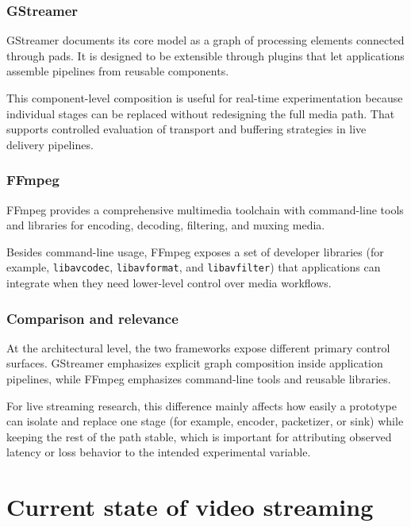 \subsubsection{GStreamer}
GStreamer documents its core model as a graph of processing elements connected through pads.
It is designed to be extensible through plugins that let applications assemble pipelines from reusable components.~\cite{gstreamerTutorials2026}

This component-level composition is useful for real-time experimentation because individual stages can be replaced without redesigning the full media path.
That supports controlled evaluation of transport and buffering strategies in live delivery pipelines.~\cite{peroniEndtoEndPipelinePerspective2025}

\subsubsection{FFmpeg}
FFmpeg provides a comprehensive multimedia toolchain with command-line tools and libraries for encoding, decoding, filtering, and muxing media.~\cite{ffmpegDocumentation2026}

Besides command-line usage, FFmpeg exposes a set of developer libraries (for example, \texttt{libavcodec}, \texttt{libavformat}, and \texttt{libavfilter}) that applications can integrate when they need lower-level control over media workflows.~\cite{ffmpegDocumentation2026}

\subsubsection{Comparison and relevance}
At the architectural level, the two frameworks expose different primary control surfaces.
GStreamer emphasizes explicit graph composition inside application pipelines, while FFmpeg emphasizes command-line tools and reusable libraries.~\cite{gstreamerTutorials2026,ffmpegDocumentation2026}

For live streaming research, this difference mainly affects how easily a prototype can isolate and replace one stage (for example, encoder, packetizer, or sink) while keeping the rest of the path stable, which is important for attributing observed latency or loss behavior to the intended experimental variable.~\cite{peroniEndtoEndPipelinePerspective2025,apostolopoulosVideoStreamingConcepts}

\section{Current state of video streaming}
